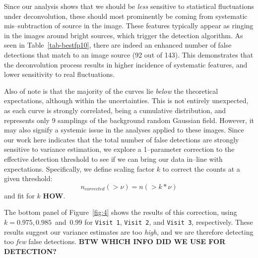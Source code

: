 \documentclass[iop]{emulateapj}
\begin{document}
Since our analysis shows that we should be {\it less} sensitive to statistical fluctuations under deconvolution, these should most prominently be coming from systematic mis--subtraction of source in the image.
These features typically appear as ringing in the images around bright sources, which trigger the detection algorithm.
As seen in Table~\ref{tab-bestfp10}, there are indeed an enhanced number of false detections that match to an image source (92 out of 143).
This demonstrates that the deconvolution process results in higher incidence of systematic features, and lower sensitivity to real fluctuations.

Also of note is that the majority of the curves lie {\it below} the theoretical expectations, although within the uncertainties.
This is not entirely unexpected, as each curve is strongly correlated, being a cumulative distribution, and represents only 9 samplings of the background random Gaussian field.
However, it may also signify a systemic issue in the analyses applied to these images.
Since our work here indicates that the total number of false detections are strongly sensitive to variance estimation, we explore a 1--parameter correction to the effective detection threshold to see if we can bring our data in--line with expectations.
Specifically, we define scaling factor $k$ to correct the counts at a given threshold:
\begin{equation}
n_{corrected}(>\nu) = n(> k * \nu)
\label{correction}
\end{equation}
and fit for $k$ {\bf HOW}.

The bottom panel of Figure~\ref{fig:4} shows the results of this correction, using $k = 0.975, 0.985 $~and~$ 0.99$ for {\tt Visit 1}, {\tt Visit 2}, and {\tt Visit 3}, respectively.
These results suggest our variance estimates are too {\it high}, and we are therefore detecting too {\it few} false detections.
{\bf BTW WHICH INFO DID WE USE FOR DETECTION?}
\end{document}
